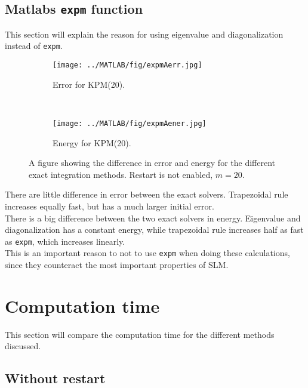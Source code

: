 \subsection{Matlabs \texttt{expm} function} \label{sec:resultexpm} %
This section will explain the reason for using eigenvalue and diagonalization instead of \texttt{expm}.

\begin{figure}[H]
        \centering
		\begin{subfigure}[b]{0.45\textwidth}
                \texttt{[image: ../MATLAB/fig/expmAerr.jpg]}
                \caption{ Error for KPM(20). }
                \label{fig:expmSerr}
        \end{subfigure}%
        ~
        \begin{subfigure}[b]{0.45\textwidth}
                \texttt{[image: ../MATLAB/fig/expmAener.jpg]}
                \caption{ Energy for KPM(20). }
                \label{fig:expmSener}
        \end{subfigure}
        \caption{A figure showing the difference in error and energy for the different exact integration methods. Restart is not enabled, $m = 20$. }
        \label{fig:expm}
\end{figure}

There are little difference in error between the exact solvers. Trapezoidal rule increases equally fast, but has a much larger initial error. \\
There is a big difference between the two exact solvers in energy. Eigenvalue and diagonalization has a constant energy, while trapezoidal rule increases half as fast as \texttt{expm}, which increases linearly. \\
This is an important reason to not to use \texttt{expm} when doing these calculations, since they counteract the most important properties of SLM. 

\section{Computation time}%
\label{sec:cruntime}
This section will compare the computation time for the different methods discussed. 

\subsection{Without restart}


